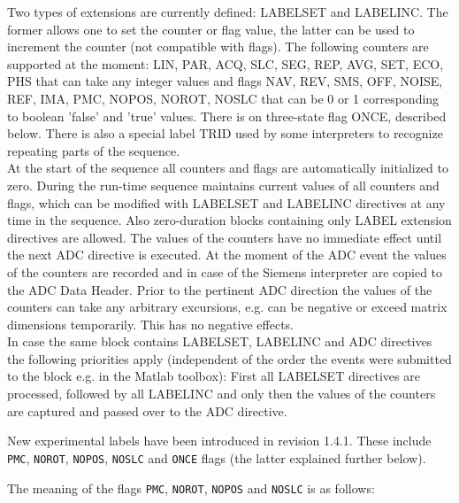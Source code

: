 \documentclass{article}
\begin{document}
Two types of extensions are currently defined: LABELSET and LABELINC. The former allows one to set the counter or flag value, the latter can be used to increment the counter (not compatible with flags). The following counters are supported at the moment: 
LIN, PAR, ACQ, SLC, SEG, REP, AVG, SET, ECO, PHS that can take any integer values and flags NAV, REV, SMS, OFF, NOISE, REF, IMA, PMC, NOPOS, NOROT, NOSLC that can be 0 or 1 corresponding to boolean 'false' and 'true' values. There is on three-state flag ONCE, described below. There is also a special label TRID used by some interpreters to recognize repeating parts of the sequence. \\

At the start of the sequence all counters and flags are automatically initialized to zero. During the run-time sequence maintains current values of all counters and flags, which can be modified with LABELSET and LABELINC directives at any time in the sequence. Also zero-duration blocks containing only LABEL extension directives are allowed. The values of the counters have no immediate effect until the next ADC directive is executed. At the moment of the ADC event the values of the counters are recorded and in case of the Siemens interpreter are copied to the ADC Data Header. Prior to the pertinent ADC direction the values of the counters can take any arbitrary excursions, e.g. can be negative or exceed matrix dimensions temporarily. This has no negative effects. \\

In case the same block contains LABELSET, LABELINC and ADC directives the following priorities apply (independent of the order the events were submitted to the block e.g. in the Matlab toolbox): First all LABELSET directives are processed, followed by all LABELINC and only then the values of the counters are captured and passed over to the ADC directive.  

New experimental labels have been introduced in revision 1.4.1. These include \verb.PMC., \verb.NOROT., \verb.NOPOS., \verb.NOSLC. and \verb.ONCE. flags (the latter explained further below). 

The meaning of the flags \verb.PMC., \verb.NOROT., \verb.NOPOS. and \verb.NOSLC. is as follows:
\end{document}

